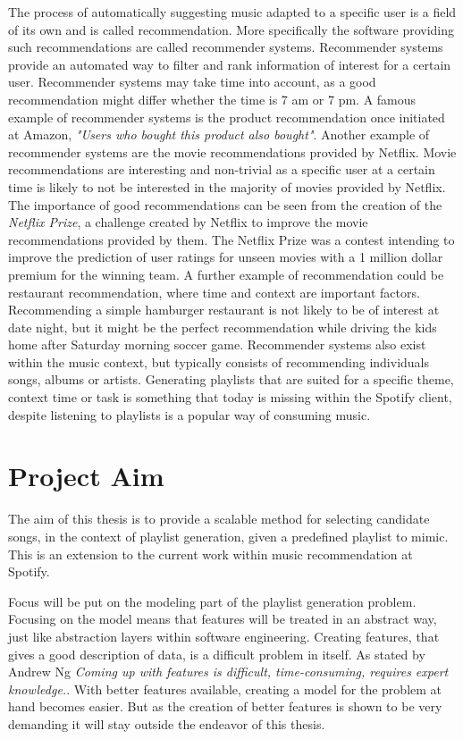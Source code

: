 \documentclass[a4paper,11pt]{kth-mag}
\begin{document}
The process of automatically suggesting music adapted to a specific user is a field of its own and is called recommendation. More specifically the software providing such recommendations are called recommender systems. Recommender systems provide an automated way to filter and rank information of interest for a certain user. Recommender systems may take time into account, as a good recommendation might differ whether the time is 7 am or 7 pm. A famous example of recommender systems is the product recommendation once initiated at Amazon, \textit{"Users who bought this product also bought"}. Another example of recommender systems are the movie recommendations provided by Netflix. Movie recommendations are interesting and non-trivial as a specific user at a certain time is likely to not be interested in the majority of movies provided by Netflix. The importance of good recommendations can be seen from the creation of the \textit{Netflix Prize}, a challenge created by Netflix to improve the movie recommendations provided by them. The Netflix Prize was a contest intending to improve the prediction of user ratings for unseen movies with a 1 million dollar premium for the winning team. A further example of recommendation could be restaurant recommendation, where time and context are important factors. Recommending a simple hamburger restaurant is not likely to be of interest at date night, but it might be the perfect recommendation while driving the kids home after Saturday morning soccer game. Recommender systems also exist within the music context, but typically consists of recommending individuals songs, albums or artists. Generating playlists that are suited for a specific theme, context time or task is something that today is missing within the Spotify client, despite listening to playlists is a popular way of consuming music.

\section{Project Aim}
The aim of this thesis is to provide a scalable method for selecting candidate songs, in the context of playlist generation, given a predefined playlist to mimic. This is an extension to the current work within music recommendation at Spotify.  

 Focus will be put on the modeling part of the playlist generation problem. Focusing on the model means that features will be treated in an abstract way, just like abstraction layers within software engineering. Creating features, that gives a good description of data, is a difficult problem in itself. As stated by Andrew Ng \textit{Coming up with features is difficult, time-consuming, requires expert knowledge.}\cite{featureEng}. With better features available, creating a model for the problem at hand becomes easier\cite{Ek:2011wu}. But as the creation of better features is shown to be very demanding it will stay outside the endeavor of this thesis.
\end{document}
